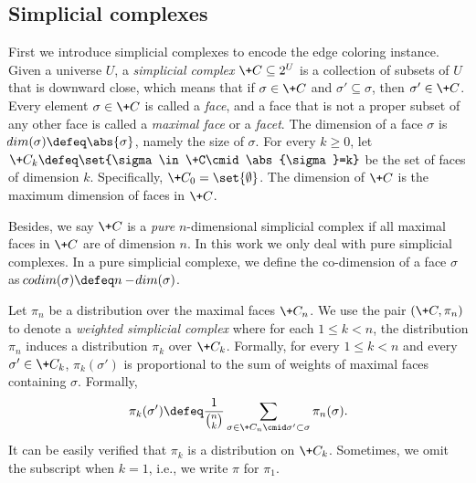 \documentclass[a4paper,11pt]{article}
\begin{document}
\subsection{Simplicial complexes}
First we introduce simplicial complexes to encode the edge coloring instance. Given a universe $U$, a \emph{simplicial complex} $\+C\subseteq 2^U$ is a collection of subsets of $U$ that is downward close, which means that if $\sigma\in \+C$ and $\sigma'\subseteq\sigma$, then $\sigma'\in \+C$. Every element $\sigma\in \+C$ is called a \emph{face}, and a face that is not a proper subset of any other face is called a \emph{maximal face} or a \emph{facet}. The dimension of a face $\sigma$ is $\!{dim}(\sigma)\defeq \abs{\sigma}$, namely the size of $\sigma$. For every $k\ge 0$, let $\+C_k\defeq \set{\sigma\in\+C\cmid \abs{\sigma}=k}$ be the set of faces of dimension $k$. Specifically, $\+C_0=\set{\emptyset}$. The dimension of $\+C$ is the maximum dimension of faces in $\+C$. 

Besides, we say $\+C$ is a \emph{pure} $n$-dimensional simplicial complex if all maximal faces in $\+C$ are of dimension $n$. In this work we only deal with pure simplicial complexes. In a pure simplicial complexe, we define the co-dimension of a face $\sigma$ as $\!{codim}(\sigma)\defeq n-\!{dim}(\sigma)$.

Let $\pi_n$ be a distribution over the maximal faces $\+C_n$. We use the pair $(\+C,\pi_n)$ to denote a \emph{weighted simplicial complex} where for each $1\le k < n$, the distribution $\pi_n$ induces a distribution $\pi_k$ over $\+C_k$. Formally, for every $1\le k<n$ and every $\sigma'\in \+C_k$, $\pi_k(\sigma')$ is proportional to the sum of weights of maximal faces containing $\sigma$. Formally,
\begin{align*}
    \pi_k(\sigma') \defeq \frac{1}{\binom n k}\sum_{\sigma\in \+C_n\cmid\sigma' \subset \sigma} \pi_{n}(\sigma).
\end{align*}
It can be easily verified that $\pi_k$ is a distribution on $\+C_k$. Sometimes, we omit the subscript when $k=1$, i.e., we write $\pi$ for $\pi_1$.
\end{document}
